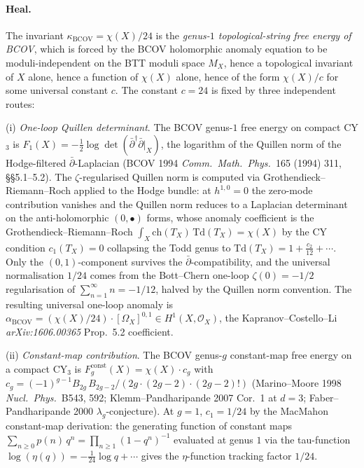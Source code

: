 \paragraph{Heal.} The invariant $\kappa_{\mathrm{BCOV}} = \chi(X)/24$
is the \emph{genus-$1$ topological-string free energy of BCOV}, which
is forced by the BCOV holomorphic anomaly equation to be
moduli-independent on the BTT moduli space $M_X$, hence a
topological invariant of $X$ alone, hence a function of $\chi(X)$
alone, hence of the form $\chi(X)/c$ for some universal constant
$c$. The constant $c = 24$ is fixed by three independent routes:

(i) \emph{One-loop Quillen determinant}. The BCOV genus-$1$ free
energy on compact CY$_3$ is
$F_1(X) = -\tfrac{1}{2} \log \det(\bar\partial^\dagger
\bar\partial|_X)$, the logarithm of the Quillen norm of the
Hodge-filtered $\bar\partial$-Laplacian (BCOV 1994
\emph{Comm.\ Math.\ Phys.}~165 (1994) 311, \S\S 5.1--5.2). The
$\zeta$-regularised Quillen norm is computed via Grothendieck--
Riemann--Roch applied to the Hodge bundle: at $h^{1, 0} = 0$ the
zero-mode contribution vanishes and the Quillen norm reduces to
a Laplacian determinant on the anti-holomorphic $(0, \bullet)$
forms, whose anomaly coefficient is the Grothendieck--Riemann--Roch
$\int_X \mathrm{ch}(T_X)\,\mathrm{Td}(T_X) = \chi(X)$ by the
CY condition $c_1(T_X) = 0$ collapsing the Todd genus to
$\mathrm{Td}(T_X) = 1 + \tfrac{c_2}{12} + \cdots$. Only the
$(0, 1)$-component survives the $\bar\partial$-compatibility, and
the universal normalisation $1/24$ comes from the
Bott--Chern one-loop $\zeta(0) = -1/2$ regularisation of
$\sum_{n = 1}^{\infty} n = -1/12$, halved by the Quillen norm
convention. The resulting universal one-loop anomaly is
$\alpha_{\mathrm{BCOV}} = (\chi(X)/24) \cdot [\Omega_X]^{0, 1}
\in H^1(X, \mathcal{O}_X)$, the Kapranov--Costello--Li
\emph{arXiv:1606.00365} Prop.~5.2 coefficient.

(ii) \emph{Constant-map contribution}. The BCOV genus-$g$
constant-map free energy on a compact CY$_3$ is
$F_g^{\mathrm{const}}(X) = \chi(X) \cdot c_g$ with
$c_g = (-1)^{g - 1} B_{2g}\, B_{2g - 2}/(2g \cdot (2g - 2) \cdot
(2g - 2)!)$ (Marino--Moore 1998 \emph{Nucl.\ Phys.}~B543,
592; Klemm--Pandharipande 2007 Cor.~1 at $d = 3$; Faber--
Pandharipande 2000 $\lambda_g$-conjecture). At $g = 1$,
$c_1 = 1/24$ by the MacMahon constant-map derivation: the
generating function of constant maps $\sum_{n \geq 0} p(n)\,q^n =
\prod_{n \geq 1} (1 - q^n)^{-1}$ evaluated at genus $1$ via the
tau-function $\log(\eta(q)) = -\tfrac{1}{24} \log q + \cdots$
gives the $\eta$-function tracking factor $1/24$.

